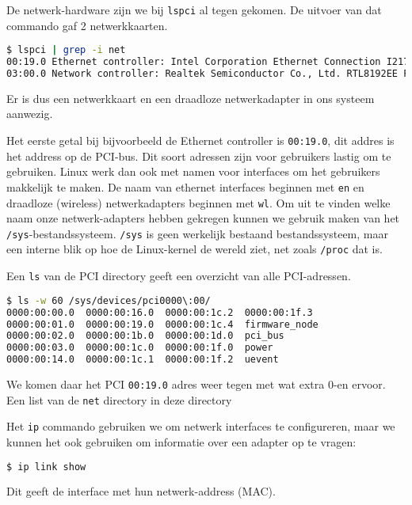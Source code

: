De netwerk-hardware zijn we bij \texttt{lspci} al tegen gekomen. De uitvoer van dat commando gaf 2 netwerkkaarten.
\begin{lstlisting}[language=bash]
$ lspci | grep -i net
00:19.0 Ethernet controller: Intel Corporation Ethernet Connection I217-LM (rev 04)
03:00.0 Network controller: Realtek Semiconductor Co., Ltd. RTL8192EE PCIe Wireless Network Adapter
\end{lstlisting}
Er is dus een netwerkkaart en een draadloze netwerkadapter in ons systeem aanwezig.

Het eerste getal bij bijvoorbeeld de Ethernet controller is \texttt{00:19.0}, dit addres is het address op de PCI-bus. Dit soort adressen zijn voor gebruikers lastig om te gebruiken. Linux werk dan ook met namen voor interfaces om het gebruikers makkelijk te maken. De naam van ethernet interfaces beginnen met \texttt{en} en draadloze (wireless) netwerkadapters beginnen met \texttt{wl}. Om uit te vinden welke naam onze netwerk-adapters hebben gekregen kunnen we gebruik maken van het \texttt{/sys}-bestandssysteem. \texttt{/sys} is geen werkelijk bestaand bestandssysteem, maar een interne blik op hoe de Linux-kernel de wereld ziet, net zoals \texttt{/proc} dat is.

Een \texttt{ls} van de PCI directory geeft een overzicht van alle PCI-adressen.
\begin{lstlisting}[language=bash]
$ ls -w 60 /sys/devices/pci0000\:00/
0000:00:00.0  0000:00:16.0  0000:00:1c.2  0000:00:1f.3
0000:00:01.0  0000:00:19.0  0000:00:1c.4  firmware_node
0000:00:02.0  0000:00:1b.0  0000:00:1d.0  pci_bus
0000:00:03.0  0000:00:1c.0  0000:00:1f.0  power
0000:00:14.0  0000:00:1c.1  0000:00:1f.2  uevent
\end{lstlisting}
We komen daar het PCI \texttt{00:19.0} adres weer tegen met wat extra 0-en ervoor. Een list van de \texttt{net} directory in deze directory

Het \texttt{ip} commando gebruiken we om netwerk interfaces te configureren, maar we kunnen het ook gebruiken om informatie over een adapter op te vragen:
\begin{lstlisting}[language=bash]
$ ip link show
\end{lstlisting}
Dit geeft de interface met hun netwerk-address (MAC).


